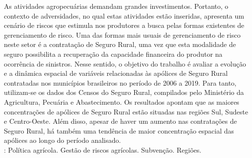 \noindent As atividades agropecuárias demandam grandes investimentos. Portanto, o contexto de adversidades, no qual estas atividades estão inseridas, apresenta um cenário de riscos que estimula nos produtores a busca pelas formas existentes de gerenciamento de risco. Uma das formas mais usuais de gerenciamento de risco neste setor é a contratação de Seguro Rural, uma vez que esta modalidade de seguro possibilita a recuperação da capacidade financeira do produtor na ocorrência de sinistros. Nesse sentido, o objetivo do trabalho é avaliar a evolução e a dinâmica espacial de variáveis relacionadas às apólices de Seguro Rural contratadas nos municípios brasileiros no período de 2006 a 2019. Para tanto, utilizam-se os dados dos Censos do Seguro Rural, compilados pelo Ministério da Agricultura, Pecuária e Abastecimento. Os resultados apontam que as maiores concentrações de apólices de Seguro Rural estão situadas nas regiões Sul, Sudeste e Centro-Oeste. Além disso, apesar de haver um aumento nas contratações de Seguro Rural, há também uma tendência de maior concentração espacial das apólices ao longo do período analisado. \\
\newline
{}: Política agrícola. Gestão de riscos agrícolas. Subvenção. Regiões. 